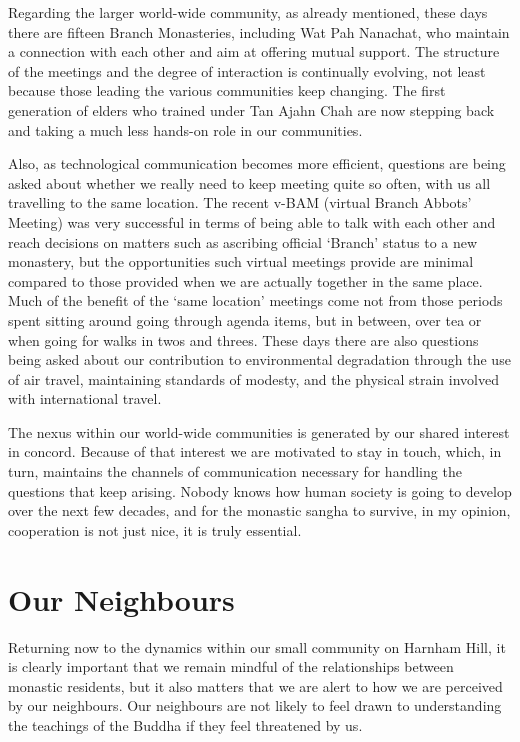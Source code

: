 Regarding the larger world-wide community, as already mentioned, these
days there are fifteen Branch Monasteries\cite{monasteries},
including Wat Pah Nanachat, who maintain a
connection with each other and aim at offering mutual support. The
structure of the meetings and the degree of interaction is continually
evolving, not least because those leading the various communities keep
changing. The first generation of elders who trained under Tan Ajahn
Chah are now stepping back and taking a much less hands-on role in our
communities.

Also, as technological communication becomes more efficient, questions
are being asked about whether we really need to keep meeting quite so
often, with us all travelling to the same location. The recent v-BAM
(virtual Branch Abbots' Meeting) was very successful in terms of being
able to talk with each other and reach decisions on matters such as
ascribing official `Branch' status to a new monastery, but the
opportunities such virtual meetings provide are minimal compared to
those provided when we are actually together in the same place. Much of
the benefit of the `same location' meetings come not from those periods
spent sitting around going through agenda items, but in between, over
tea or when going for walks in twos and threes. These days there are
also questions being asked about our contribution to environmental
degradation through the use of air travel, maintaining standards of
modesty, and the physical strain involved with international travel.

The nexus within our world-wide communities is generated by our shared
interest in concord. Because of that interest we are motivated to stay
in touch, which, in turn, maintains the channels of communication
necessary for handling the questions that keep arising. Nobody knows how
human society is going to develop over the next few decades, and for the
monastic sangha to survive, in my opinion, cooperation is not just nice,
it is truly essential.

\section{Our Neighbours}

Returning now to the dynamics within our small community on Harnham
Hill, it is clearly important that we remain mindful of the
relationships between monastic residents, but it also matters that we
are alert to how we are perceived by our neighbours. Our neighbours are
not likely to feel drawn to understanding the teachings of the Buddha if
they feel threatened by us.

